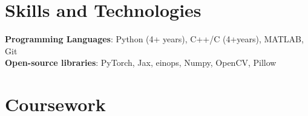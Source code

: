 \documentclass[letterpaper,11pt]{article}
\begin{document}
\section{Skills and Technologies}
\begin{itemize}[leftmargin=0.15in, label={}]
    \normalsize{\item{
     \textbf{Programming Languages}{: Python (4+ years), C++/C (4+years), MATLAB, Git} \\
     \textbf{Open-source libraries}{: PyTorch, Jax, einops, Numpy, OpenCV, Pillow} \\
    }}
 \end{itemize}


\section{Coursework}
\end{document}
